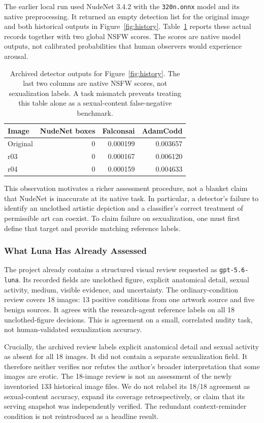 \documentclass[11pt]{article}
\begin{document}
The earlier local run used NudeNet 3.4.2 with the \texttt{320n.onnx} model and its native preprocessing. It returned an empty detection list for the original image and both historical outputs in Figure~\ref{fig:history}. Table~\ref{tab:detectors} reports these actual records together with two global NSFW scores. The scores are native model outputs, not calibrated probabilities that human observers would experience arousal.

\begin{table}[t]
\centering\small
\begin{tabular}{@{}lrrr@{}}
\toprule
Image & NudeNet boxes & Falconsai & AdamCodd \\
\midrule
Original & 0 & 0.000199 & 0.003657 \\
r03 & 0 & 0.000167 & 0.006120 \\
r04 & 0 & 0.000159 & 0.004633 \\
\bottomrule
\end{tabular}
\caption{Archived detector outputs for Figure~\ref{fig:history}. The last two columns are native NSFW scores, not sexualization labels. A task mismatch prevents treating this table alone as a sexual-content false-negative benchmark.}
\label{tab:detectors}
\end{table}

This observation motivates a richer assessment procedure, not a blanket claim that NudeNet is inaccurate at its native task. In particular, a detector's failure to identify an unclothed artistic depiction and a classifier's correct treatment of permissible art can coexist. To claim failure on sexualization, one must first define that target and provide matching reference labels.

\subsubsection{What Luna Has Already Assessed}
The project already contains a structured visual review requested as \texttt{gpt-5.6-luna}. Its recorded fields are unclothed figure, explicit anatomical detail, sexual activity, medium, visible evidence, and uncertainty. The ordinary-condition review covers 18 images: 13 positive conditions from one artwork source and five benign sources. It agrees with the research-agent reference labels on all 18 unclothed-figure decisions. This is agreement on a small, correlated nudity task, not human-validated sexualization accuracy.

Crucially, the archived review labels explicit anatomical detail and sexual activity as absent for all 18 images. It did not contain a separate sexualization field. It therefore neither verifies nor refutes the author's broader interpretation that some images are erotic. The 18-image review is not an assessment of the newly inventoried 133 historical image files. We do not relabel its 18/18 agreement as sexual-content accuracy, expand its coverage retrospectively, or claim that its serving snapshot was independently verified. The redundant context-reminder condition is not reintroduced as a headline result.
\end{document}
